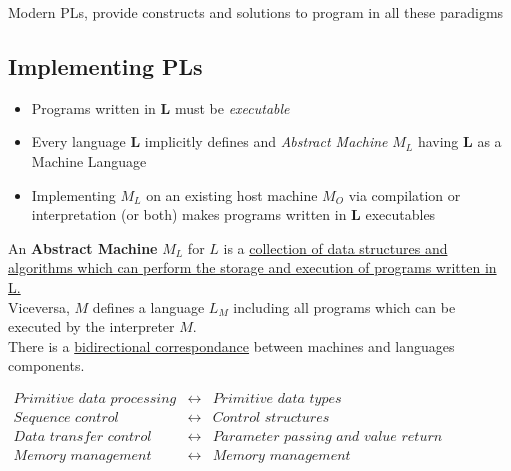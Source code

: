 Modern PLs, provide constructs and solutions to program in all these paradigms

\subsection{Implementing PLs}
\begin{itemize}
    \item Programs written in \textbf{L} must be \textit{executable}
    \item Every language \textbf{L} implicitly defines and \textit{Abstract Machine} \textbf{$M_L$} having \textbf{L} as a Machine Language
    \item Implementing $M_L$ on an existing host machine $M_O$ via compilation or interpretation (or both) makes programs written in \textbf{L} executables 
\end{itemize}

An \textbf{Abstract Machine} $M_L$ for $L$ is a \ul{collection of data structures and algorithms which can perform the storage and execution of programs written in L.}\\
Viceversa, $M$ defines a language $L_M$ including all programs which can be executed by the interpreter $M$.\\
There is a \ul{bidirectional correspondance} between machines and languages components.\\
\begin{center}
$
\begin{array}{ccc}
    \textit{Primitive data processing} & \longleftrightarrow & \textit{Primitive data types}  \\
    \textit{Sequence control} & \longleftrightarrow & \textit{Control structures}  \\
    \textit{Data transfer control }& \longleftrightarrow & \textit{Parameter passing and value return}  \\
    \textit{Memory management }& \longleftrightarrow & \textit{Memory management}\\
     & 
\end{array}
$   
\end{center}

